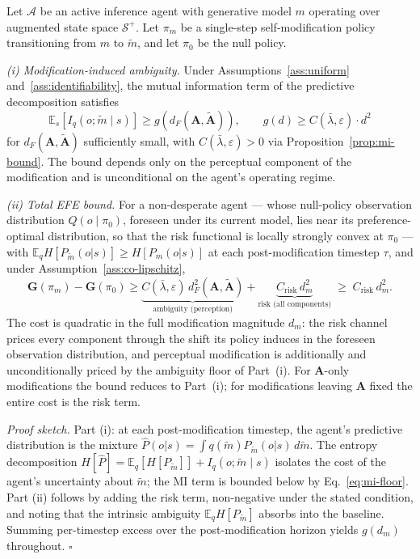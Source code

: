 \documentclass[runningheads]{llncs}
\begin{document}
\begin{theorem}
\label{thm:single-step}
Let $\mathcal{A}$ be an active inference agent with generative model $m$ operating over augmented state space $\mathcal{S}^+$. Let $\pi_m$ be a single-step self-modification policy transitioning from $m$ to $\tilde{m}$, and let $\pi_0$ be the null policy.

\emph{(i) Modification-induced ambiguity.} Under Assumptions~\ref{ass:uniform}
and~\ref{ass:identifiability}, the mutual information term of the predictive
decomposition satisfies
\begin{equation}
\mathbb{E}_s\!\left[I_q(o; \tilde m \mid s)\right] \geq g(d_F(\mathbf{A}, \tilde{\mathbf{A}})),
\qquad g(d) \geq C(\bar\lambda, \varepsilon)\cdot d^2
\end{equation}
for $d_F(\mathbf{A}, \tilde{\mathbf{A}})$ sufficiently small, with $C(\bar\lambda, \varepsilon) > 0$ via
Proposition~\ref{prop:mi-bound}. The bound depends only on the perceptual
component of the modification and is unconditional on the agent's operating
regime.

\emph{(ii) Total EFE bound.} For a non-desperate agent --- whose null-policy observation distribution $Q(o\mid\pi_0)$, foreseen under its current model, lies near its preference-optimal distribution, so that the risk functional is locally strongly convex at $\pi_0$ --- with $\mathbb{E}_q H[P_{\tilde{m}}(o|s)] \geq H[P_m(o|s)]$ at each post-modification timestep $\tau$, and under Assumption~\ref{ass:co-lipschitz},
\begin{equation}
\mathbf{G}(\pi_m) - \mathbf{G}(\pi_0) \geq \underbrace{C(\bar\lambda,\varepsilon)\, d_F^2(\mathbf{A}, \tilde{\mathbf{A}})}_{\text{ambiguity (perception)}} + \underbrace{C_{\mathrm{risk}}\, d_m^2}_{\text{risk (all components)}} \;\geq\; C_{\mathrm{risk}}\, d_m^2.
\end{equation}
The cost is quadratic in the full modification magnitude $d_m$: the risk channel prices every component through the shift its policy induces in the foreseen observation distribution, and perceptual modification is additionally and unconditionally priced by the ambiguity floor of Part~(i). For $\mathbf{A}$-only modifications the bound reduces to Part~(i); for modifications leaving $\mathbf{A}$ fixed the entire cost is the risk term.
\end{theorem}

\emph{Proof sketch.} Part (i): at each post-modification timestep, the agent's predictive distribution is the mixture $\hat{P}(o|s) = \int q(\tilde{m}) P_{\tilde{m}}(o|s) \, d\tilde{m}$. The entropy decomposition $H[\hat{P}] = \mathbb{E}_q[H[P_{\tilde{m}}]] + I_q(o; \tilde{m} \mid s)$ isolates the cost of the agent's uncertainty about $\tilde{m}$; the MI term is bounded below by Eq.~\ref{eq:mi-floor}. Part (ii) follows by adding the risk term, non-negative under the stated condition, and noting that the intrinsic ambiguity $\mathbb{E}_q H[P_{\tilde{m}}]$ absorbs into the baseline. Summing per-timestep excess over the post-modification horizon yields $g(d_m)$ throughout. $\square$
\end{document}
